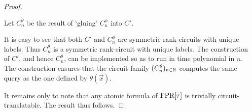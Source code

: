 \documentclass[../paper.tex]{subfiles}
\begin{document}
\begin{proof}
\begin{itemize}
    \end{itemize}
    Let $C^{\theta}_n$ be the result of `gluing' $C^{\phi}_n$ into $C'$.

    It is easy to see that both $C'$ and $C^{\phi}_n$ are symmetric
    rank-circuits with unique labels. Thus $C^{\theta}_n$ is a symmetric
    rank-circuit with unique labels. The construction of $C'$, and hence
    $C^{\theta}_n$, can be implemented so as to run in time polynomial in $n$.
    The construction ensures that the circuit family $(C^{\theta}_n)_{n \in
      \mathbb{N}}$ computes the same query as the one defined by $\theta(\vec{x})$.

    It remains only to note that any atomic formula of $\text{\upshape FPR}[\tau]$ is trivially
    circuit-translatable. The result thus follows.
  \end{proof}









\end{document}
